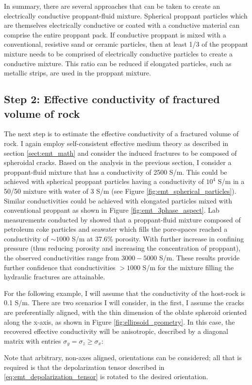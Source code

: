 

In summary, there are several approaches that can be taken to create an electrically conductive proppant-fluid mixture. Spherical proppant particles which are themselves electrically conductive or coated with a conductive material can comprise the entire proppant pack. If conductive proppant is mixed with a conventional, resistive sand or ceramic particles, then at least 1/3 of the proppant mixture needs to be comprised of electrically conductive particles to create a conductive mixture. This ratio can be reduced if elongated particles, such as metallic strips, are used in the proppant mixture.

\subsection{Step 2: Effective conductivity of fractured volume of rock}
\label{sec:emt-rock-volume}
The next step is to estimate the effective conductivity of a fractured volume of rock. I again employ self-consistent effective medium theory as described in section \ref{sect:emt_math} and consider the induced fractures to be composed of spheroidal cracks. Based on the analysis in the previous section, I consider a proppant-fluid mixture that has a conductivity of 2500 S/m. This could be achieved with spherical proppant particles having a conductivity of $10^4$ S/m in a 50/50 mixture with water of 3 S/m (see Figure \ref{fig:emt_spherical_particles}). Similar conductivities could be achieved with elongated particles mixed with conventional proppant as shown in Figure \ref{fig:emt_3phase_aspect}. Lab measurements conducted by \cite{Zhang2016} showed that a proppant-fluid mixture composed of petroleum coke particles and seawater which fills the pore-spaces reached a conductivity of $\sim 1000$ S/m at 37.6\% porosity. With further increase in confining pressure (thus reducing porosity and increasing the concentration of proppant), the observed conductivities range from  $3000 - 5000$ S/m. These results provide further confidence that conductivities $> 1000$ S/m for the mixture filling the hydraulic fractures are attainable.


For the following example, I will assume that the conductivity of the host-rock is 0.1 S/m. There are two scenarios I will consider, in the first, I assume the cracks are preferentially aligned, with the thin dimension of the oblate spheroid oriented along the x-axis, as shown in Figure \ref{fig:ellipsoid_geometry}. In this case, the recovered effective conductivity will be anisotropic, described by a diagonal matrix with entries $\sigma_y = \sigma_z \geq \sigma_x:$

Note that arbitrary, non-axes aligned, orientations can be considered; all that is required is that the depolarization tensor described in \ref{eq:emt_depolarization_tensor} is rotated to the desired orientation.


